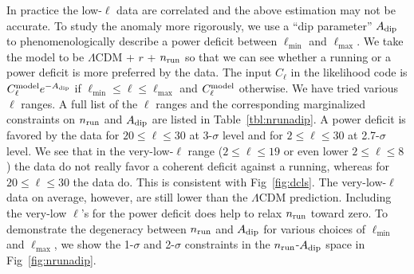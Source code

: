 \documentclass[11pt]{article}
\begin{document}
In practice the low-$\ell$ data are correlated and the above estimation may not be accurate. To study the anomaly more rigorously, we use a ``dip parameter'' $A_{\rm dip}$ to phenomenologically describe a power deficit between $\ell_{\min}$ and $\ell_{\max}$. We take the model to be $\Lambda$CDM + $r$ + $n_{\rm run}$ so that we can see whether a running or a power deficit is more preferred by the data. The input $C_{\ell}$ in the likelihood code is $C_\ell^{\rm model}e^{-A_{\rm dip}}$ if $\ell_{\min}\le \ell \le \ell_{\max}$ and $C_\ell^{\rm model}$ otherwise. We have tried various $\ell$ ranges. A full list of the $\ell$ ranges and the corresponding marginalized constraints on $n_{\rm run}$ and $A_{\rm dip}$ are listed in Table~\ref{tbl:nrunadip}. A power deficit is favored by the data for $20\le \ell \le 30$ at $3$-$\sigma$ level and for $2\le \ell \le 30$ at 2.7-$\sigma$ level. We see that in the very-low-$\ell$ range ($2\le \ell \le 19$ or even lower $2\le \ell \le 8$ ) the data do not really favor a coherent deficit against a running, whereas for $20\le\ell\le30$ the data do. This is consistent with Fig~\ref{fig:dcls}. The very-low-$\ell$ data on average, however, are still lower than the $\Lambda$CDM prediction. Including the very-low $\ell$'s for the power deficit does help to relax $n_{\rm run}$ toward zero. To demonstrate the degeneracy between $n_{\rm run}$ and $A_{\rm dip}$ for various choices of $\ell_{\min}$ and $\ell_{\max}$, we show the 1-$\sigma$ and 2-$\sigma$ constraints in the $n_{\rm run}$-$A_{\rm dip}$ space in Fig~\ref{fig:nrunadip}. 
\end{document}
